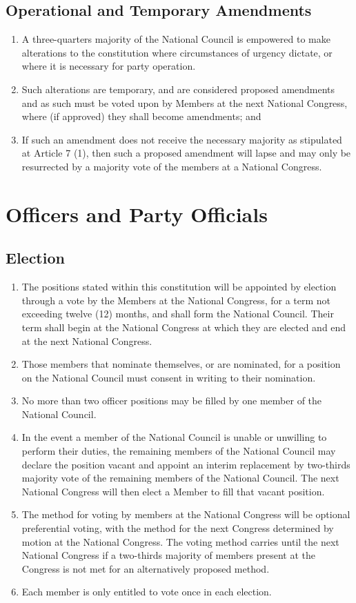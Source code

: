\documentclass[a4paper,titlepage,8.5pt]{article}
\begin{document}
\subsection{Operational and Temporary Amendments}

\begin{enumerate}
\item A three-quarters majority of the National Council is empowered to make alterations to the constitution where circumstances of urgency dictate, or where it is necessary for party operation.
\item Such alterations are temporary, and are considered proposed amendments and as such must be voted upon by Members at the next National Congress, where (if approved) they shall become amendments; and
\item If such an amendment does not receive the necessary majority as stipulated at Article 7 (1), then such a proposed amendment will lapse and may only be resurrected by a majority vote of the members at a National Congress.
\end{enumerate}

\section{Officers and Party Officials}

\subsection{Election}

\begin{enumerate}
\item The positions stated within this constitution will be appointed by election through a vote by the Members at the National Congress, for a term not exceeding twelve (12) months, and shall form the National Council. Their term shall begin at the National Congress at which they are elected and end at the next National Congress.
\item Those members that nominate themselves, or are nominated, for a position on the National Council must consent in writing to their nomination.
\item No more than two officer positions may be filled by one member of the National Council.
\item In the event a member of the National Council is unable or unwilling to perform their duties, the remaining members of the National Council may declare the position vacant and appoint an interim replacement by two-thirds majority vote of the remaining members of the National Council. The next National Congress will then elect a Member to fill that vacant position.
\item The method for voting by members at the National Congress will be optional preferential voting, with the method for the next Congress determined by motion at the National Congress. The voting method carries until the next National Congress if a two-thirds majority of members present at the Congress is not met for an alternatively proposed method.
\item Each member is only entitled to vote once in each election.
\end{enumerate}
\end{document}
